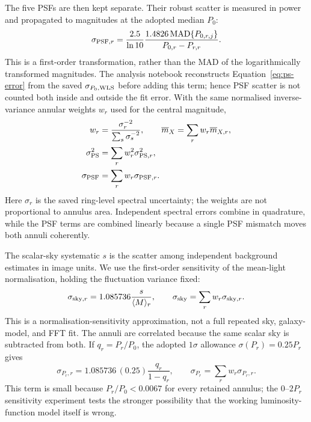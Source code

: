 \documentclass[nodoi,nocopyright]{pas}
\newcommand{\mbar}{\overline{m}}
\begin{document}
The five PSFs are then kept separate. Their robust scatter is measured in
power and propagated to magnitudes at the adopted median $P_0$:
\begin{equation}
 \sigma_{{\rm PSF},r}=
 \frac{2.5}{\ln 10}\frac{1.4826\,{\rm MAD}\{P_{0,r,j}\}}{P_{0,r}-P_{r,r}}.
\end{equation}
This is a first-order transformation, rather than the MAD of the
logarithmically transformed magnitudes.
The analysis notebook reconstructs Equation~\ref{eq:ps-error} from the saved
$\sigma_{P_0,{\rm WLS}}$ before adding this term; hence PSF scatter is not
counted both inside and outside the fit error. With the same normalised
inverse-variance annular weights $w_r$ used for the central magnitude,
\begin{align}
 w_r&=\frac{\sigma_r^{-2}}{\sum_s\sigma_s^{-2}},\qquad
 \mbar_X=\sum_r w_r\mbar_{X,r},\\
 \sigma_{\rm PS}^2&=\sum_r w_r^2\sigma_{{\rm PS},r}^2,\\
 \sigma_{\rm PSF}&=\sum_r w_r\sigma_{{\rm PSF},r}.
\end{align}
Here $\sigma_r$ is the saved ring-level spectral uncertainty; the weights are
not proportional to annulus area.  Independent spectral errors combine in
quadrature, while the PSF terms are combined linearly because a single PSF
mismatch moves both annuli coherently.

The scalar-sky systematic $s$ is the scatter among independent background
estimates in image units. We use the first-order sensitivity of the
mean-light normalisation, holding the fluctuation variance fixed:
\begin{equation}
 \sigma_{{\rm sky},r}=1.085736\frac{s}{\langle M\rangle_r},\qquad
 \sigma_{\rm sky}=\sum_r w_r\sigma_{{\rm sky},r}.
\end{equation}
This is a normalisation-sensitivity approximation, not a full repeated sky,
galaxy-model, and FFT fit. The annuli are correlated because the same scalar
sky is subtracted from both. If $q_r=P_{r}/P_0$, the adopted
$1\sigma$ allowance $\sigma(P_r)=0.25P_r$ gives
\begin{equation}
 \sigma_{P_r,r}=1.085736\,(0.25)\frac{q_r}{1-q_r},\qquad
 \sigma_{P_r}=\sum_r w_r\sigma_{P_r,r}.
 \label{eq:pr-error}
\end{equation}
This term is small because $P_r/P_0<0.0067$ for every retained annulus; the
0--$2P_r$ sensitivity experiment tests the stronger possibility that the
working luminosity-function model itself is wrong.
\end{document}
